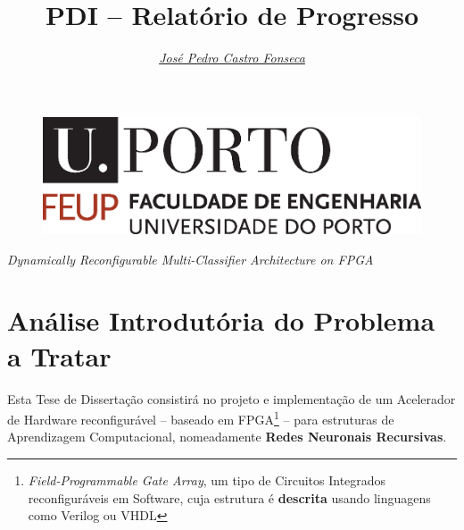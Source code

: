 \documentclass[a4paper, onecolumn, 10pt]{article}
\title{\Huge PDI -- Relatório de Progresso}
\author{\itshape \href{mailto:ee11126@fe.up.pt}{José Pedro Castro Fonseca}   }
\begin{document}
\pagestyle{plain}

\begin{figure}
	\centering
	\includegraphics[scale=0.3]{logo_feup.eps}
\end{figure}
\sffamily
\maketitle



\rmfamily\pagestyle{fancy}
\begin{center}
	\Large \textit{Dynamically Reconfigurable Multi-Classifier Architecture on FPGA}
\end{center}
\section{Análise Introdutória do Problema a Tratar}\label{sec:analiseProb}
Esta Tese de Dissertação consistirá no projeto e implementação de um Acelerador de Hardware reconfigurável -- baseado em FPGA\footnote{\textit{Field-Programmable Gate Array}, um tipo de Circuitos Integrados reconfiguráveis em Software, cuja estrutura é \textbf{descrita} usando linguagens como Verilog ou VHDL} -- para estruturas de Aprendizagem Computacional, nomeadamente \textbf{Redes Neuronais Recursivas}. 	
\end{document}
